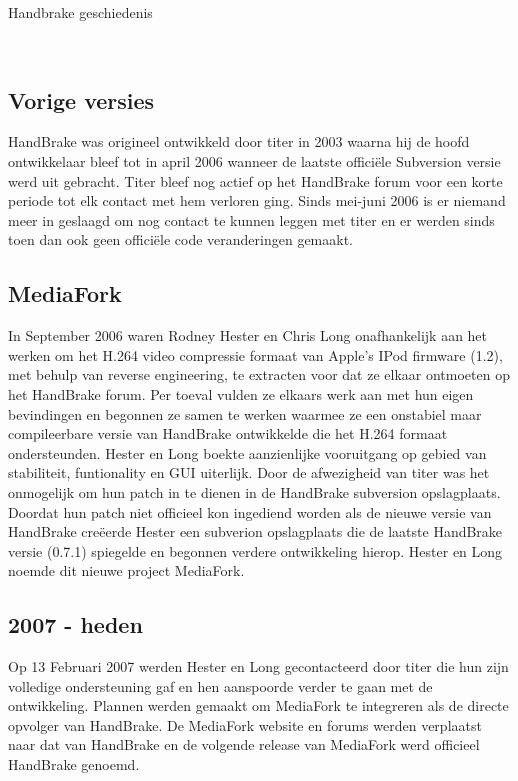 \label{Hoofdstuk 2}

\begin{sectionbox}{Handbrake geschiedenis}\end{sectionbox}
\ \\
\subsection{Vorige versies}

HandBrake was origineel ontwikkeld door titer in 2003 waarna hij de hoofd ontwikkelaar bleef tot in april 2006 wanneer de laatste officiële Subversion versie werd uit gebracht. Titer bleef nog actief op het HandBrake forum voor een korte periode tot elk contact met hem verloren ging. Sinds mei-juni 2006 is er niemand meer in geslaagd om nog contact te kunnen leggen met titer en er werden sinds toen dan ook geen officiële code veranderingen gemaakt.

\subsection{MediaFork}

In September 2006 waren Rodney Hester en Chris Long onafhankelijk aan het werken om het H.264 video compressie formaat van Apple's IPod firmware (1.2), met behulp van reverse engineering, te extracten voor dat ze elkaar ontmoeten op het HandBrake forum. Per toeval vulden ze elkaars werk aan met hun eigen bevindingen en begonnen ze samen te werken waarmee ze een onstabiel maar compileerbare versie van HandBrake ontwikkelde die het H.264 formaat ondersteunden. Hester en Long boekte aanzienlijke vooruitgang op gebied van stabiliteit, funtionality en GUI uiterlijk. Door de afwezigheid van titer was het onmogelijk om hun patch in te dienen in de HandBrake subversion opslagplaats.\\

Doordat hun patch niet officieel kon ingediend worden als de nieuwe versie van HandBrake creëerde Hester een subverion opslagplaats die de laatste HandBrake versie (0.7.1) spiegelde en begonnen verdere ontwikkeling hierop. Hester en Long noemde dit nieuwe project MediaFork.

\subsection{2007 - heden}

Op 13 Februari 2007 werden Hester en Long gecontacteerd door titer die hun zijn volledige ondersteuning gaf en hen aanspoorde verder te gaan met de ontwikkeling. Plannen werden gemaakt om MediaFork te integreren als de directe opvolger van HandBrake. De MediaFork website en forums werden verplaatst naar dat van HandBrake en de volgende release van MediaFork werd officieel HandBrake genoemd.\\
\ \\

